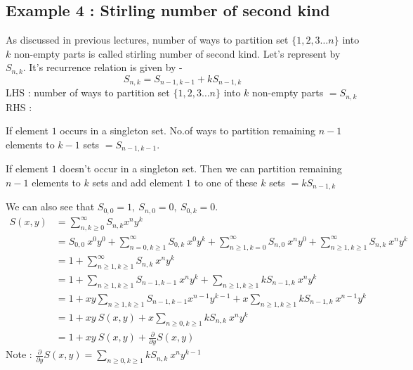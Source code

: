 \subsection{Example 4 : Stirling number of second kind} 
As discussed in previous lectures, number of ways to partition set $\{1, 2, 3 \dots n \}$ into $k$ non-empty parts is called stirling number of second kind. Let's represent by $S_{n,k}$. It's recurrence relation is given by -  
$$S_{n, k} = S_{n-1, k-1} + k S_{n-1, k} $$
LHS : number of ways to partition set $\{1, 2, 3 \dots n \}$ into $k$ non-empty parts $ = S_{n, k}$ \\
RHS : \begin{parts}
\item If element $1$ occurs in a singleton set. No.of ways to partition remaining $n-1$ elements to $k-1$ sets $= S_{n-1, k-1}$.
\item If element $1$ doesn't occur in a singleton set. Then we can partition remaining $n-1$ elements to $k$ sets and add element $1$ to one of these $k$ sets $=  k S_{n-1, k}$
\end{parts}
We can also see that $S_{0,0} = 1 ,~ S_{n, 0} = 0 ,~ S_{0, k} = 0$.
\begin{align*}
 S(x, y) &= {\sum_{n, k \geq 0} ^ {\infty} S_{n,k} x^n y^k} \\
&= S_{0,0}~x^0y^0 + {\sum_{n = 0, k \geq 1}^ {\infty} S_{0,k}~x^0y^k} + {\sum_{n \geq 1, k = 0}^ {\infty} S_{n,0}~x^n y^0} + {\sum_{n \geq 1, k \geq 1}^ {\infty} S_{n,k}~x^n y^k}  \\
 &= 1 + \sum_{n \geq 1 , k \geq 1} ^ {\infty} S_{n,k} ~ x^n y^k  \\
 &= 1 + \sum_{n \geq 1 , k \geq 1} S_{n-1, k-1}~ x^n y^k + \sum_{n \geq 1, k \geq 1} k S_{n-1, k}~ x^n y^k \\
 &= 1 + xy \sum_{n \geq 1, k \geq 1} S_{n-1, k-1} x^{n-1} y^{k-1} + x\sum_{n \geq 1, k \geq 1} k S_{n-1, k}~ x^{n-1} y^k \\
 &= 1 + xy~ S(x, y) + x \sum_{n \geq 0, k \geq 1} k S_{n, k}~ x^{n} y^k \\
 &= 1 + xy~ S(x, y) + \frac{\partial}{\partial y} S(x,y)
\end{align*}
Note : $\frac{\partial}{\partial y} S(x, y) = \sum_{n \geq 0, k \geq 1} k S_{n,k}~x^n y^{k-1}$ 


